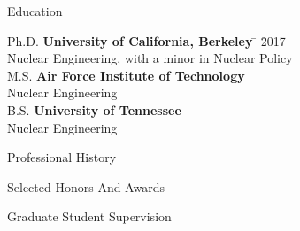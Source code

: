 \documentclass{resume2} %
\begin{document}

\begin{rSection}{Education}

\begin{tabbing}
Ph.D. \hspace*{2 em}\= \textbf{University of California, Berkeley} \hspace*{5em} \= \hspace*{15em} \= 2017 \\
      \> Nuclear Engineering, with a minor in Nuclear Policy \\
%
M.S. \hspace*{2 em}\> \textbf{Air Force Institute of Technology} \>  \\
      \> Nuclear Engineering\\
%
B.S. \hspace*{2 em}\> \textbf{University of Tennessee} \>  \\
      \> Nuclear Engineering
\end{tabbing}
\end{rSection}

\begin{rSection}{Professional History}

\end{rSection}

\begin{rSection}{Selected Honors And Awards}

\end{rSection}

%

\begin{rSection}{Graduate Student Supervision}

\end{rSection}
\end{document}
